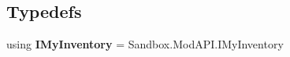 \subsection*{Typedefs}
\begin{DoxyCompactItemize}
\item 
\hypertarget{namespace_s_e_mod_a_p_i_internal_1_1_a_p_i_1_1_entity_ae34ad0ea3c600e4c9f28edd9c7951dcd}{}using {\bfseries I\+My\+Inventory} = Sandbox.\+Mod\+A\+P\+I.\+I\+My\+Inventory\label{namespace_s_e_mod_a_p_i_internal_1_1_a_p_i_1_1_entity_ae34ad0ea3c600e4c9f28edd9c7951dcd}

\end{DoxyCompactItemize}
